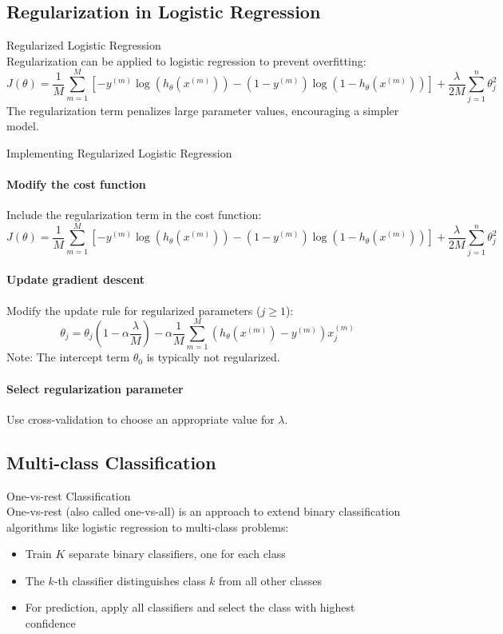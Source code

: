\subsection{Regularization in Logistic Regression}

\begin{definition}{Regularized Logistic Regression}\\
Regularization can be applied to logistic regression to prevent overfitting:
\[J(\theta) = \frac{1}{M}\sum_{m=1}^{M}[-y^{(m)}\log(h_\theta(x^{(m)})) - (1-y^{(m)})\log(1-h_\theta(x^{(m)}))] + \frac{\lambda}{2M}\sum_{j=1}^{n}\theta_j^2\]
The regularization term penalizes large parameter values, encouraging a simpler model.
\end{definition}

\begin{KR}{Implementing Regularized Logistic Regression}\\
\paragraph{Modify the cost function}
Include the regularization term in the cost function:
\[J(\theta) = \frac{1}{M}\sum_{m=1}^{M}[-y^{(m)}\log(h_\theta(x^{(m)})) - (1-y^{(m)})\log(1-h_\theta(x^{(m)}))] + \frac{\lambda}{2M}\sum_{j=1}^{n}\theta_j^2\]

\paragraph{Update gradient descent}
Modify the update rule for regularized parameters ($j \geq 1$):
\[\theta_j = \theta_j(1-\alpha\frac{\lambda}{M}) - \alpha\frac{1}{M}\sum_{m=1}^{M}(h_\theta(x^{(m)}) - y^{(m)})x^{(m)}_j\]
Note: The intercept term $\theta_0$ is typically not regularized.

\paragraph{Select regularization parameter}
Use cross-validation to choose an appropriate value for $\lambda$.
\end{KR}

\subsection{Multi-class Classification}

\begin{definition}{One-vs-rest Classification}\\
One-vs-rest (also called one-vs-all) is an approach to extend binary classification algorithms like logistic regression to multi-class problems:
\begin{itemize}
    \item Train $K$ separate binary classifiers, one for each class
    \item The $k$-th classifier distinguishes class $k$ from all other classes
    \item For prediction, apply all classifiers and select the class with highest confidence
\end{itemize}
\end{definition}

